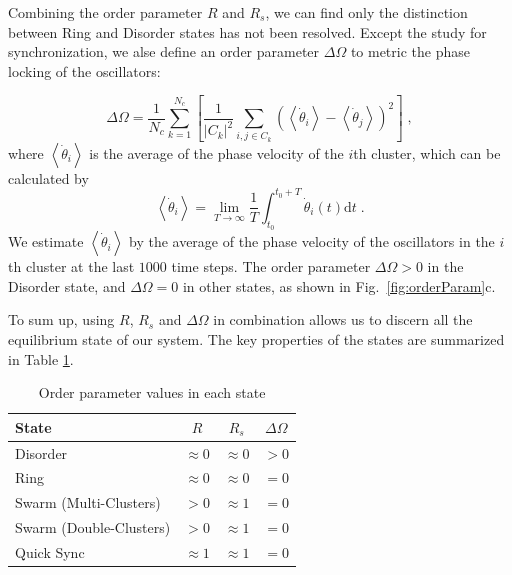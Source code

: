 \documentclass[%
 aip,
 amsmath,amssymb,
 reprint,%
]{revtex4-1}
\begin{document}
Combining the order parameter $R$ and $R_s$, we can find only the distinction between Ring and Disorder states has not been resolved. Except the study for synchronization, we alse define an order parameter $\Delta \Omega$ to metric the phase locking of the oscillators:

\begin{equation}
    \Delta \Omega =\frac{1}{N_c}\sum_{k=1}^{N_c}{\left[ \frac{1}{\left| C_k \right|^2}\sum_{i,j\in C_k}{\left( \left< \dot{\theta}_i \right> -\left< \dot{\theta}_j \right> \right) ^2} \right]}\;,
\end{equation}
where $\left< \dot{\theta}_i \right>$ is the average of the phase velocity of the $i$th cluster, which can be calculated by
\begin{equation}
    \left< \dot{\theta}_i \right> =\lim_{T\rightarrow \infty} \frac{1}{T}\int_{t_0}^{t_0+T}{\dot{\theta}_i\left( t \right) \mathrm{d}t}\;.
\end{equation}
We estimate $\left< \dot{\theta}_i \right>$ by the average of the phase velocity of the oscillators in the $i$th cluster at the last $1000$ time steps. 
The order parameter $\Delta \Omega > 0$ in the Disorder state, and $\Delta \Omega = 0$ in other states, as shown in Fig.~\ref{fig:orderParam}c.

To sum up, using $R$, $R_s$ and $\Delta \Omega$ in combination allows us to discern all the equilibrium state of our system. 
The key properties of the states are summarized in Table \ref{tab:orderParam}.

\begin{table}
    \caption{\label{tab:orderParam} Order parameter values in each state 
    }
    \begin{ruledtabular}
        \begin{tabular}{lccc}
        State& $R$ & $R_s$ & $\Delta\Omega$ \\
        \hline
        Disorder&$\approx 0$&$\approx 0$&$> 0$\\
        Ring&$\approx 0$&$\approx 0$&$= 0$\\
        Swarm (Multi-Clusters)&$> 0$&$\approx 1$\footnotemark[1]&$= 0$\\
        Swarm (Double-Clusters)&$> 0$&$\approx 1$&$= 0$\\
        Quick Sync&$\approx 1$&$\approx 1$&$= 0$\\
        \end{tabular}
    \end{ruledtabular}
\end{table}
\end{document}
